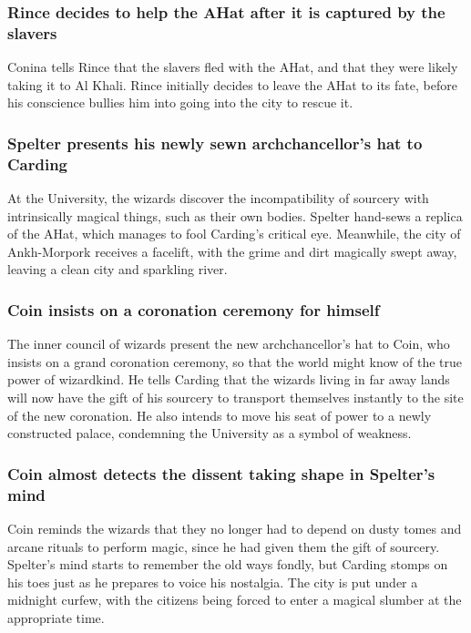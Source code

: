 \subsubsection{\Gls{Rince} decides to help the \Gls{AHat} after it is captured by the slavers}
\Gls{Conina} tells \Gls{Rince} that the slavers fled with the \Gls{AHat}, and that they were
likely taking it to Al Khali. \Gls{Rince} initially decides to leave the \Gls{AHat} to its fate,
before his conscience bullies him into going into the city to rescue it.

\subsubsection{\Gls{Spelter} presents his newly sewn archchancellor's hat to \Gls{Carding}}
At the University, the wizards discover the incompatibility of sourcery with intrinsically magical
things, such as their own bodies. \Gls{Spelter} hand-sews a replica of the \Gls{AHat}, which manages
to fool \Gls{Carding}'s critical eye. Meanwhile, the city of Ankh-Morpork receives a facelift,
with the grime and dirt magically swept away, leaving a clean city and sparkling river.

\subsubsection{\Gls{Coin} insists on a coronation ceremony for himself}
The inner council of wizards present the new archchancellor's hat to \Gls{Coin}, who insists on a
grand coronation ceremony, so that the world might know of the true power of wizardkind. He tells
\Gls{Carding} that the wizards living in far away lands will now have the gift of his sourcery to
transport themselves instantly to the site of the new coronation. He also intends to move his seat
of power to a newly constructed palace, condemning the University as a symbol of weakness.

\subsubsection{\Gls{Coin} almost detects the dissent taking shape in \Gls{Spelter}'s mind}
\Gls{Coin} reminds the wizards that they no longer had to depend on dusty tomes and arcane rituals
to perform magic, since he had given them the gift of sourcery. \Gls{Spelter}'s mind starts to
remember the old ways fondly, but \Gls{Carding} stomps on his toes just as he prepares to voice his
nostalgia. The city is put under a midnight curfew, with the citizens being forced to enter a
magical slumber at the appropriate time.

